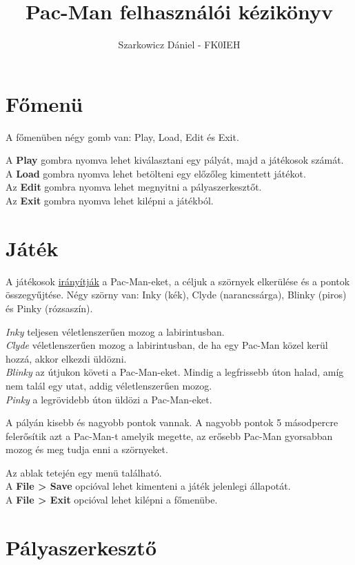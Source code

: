 \documentclass{article}
\title{Pac-Man felhasználói kézikönyv}
\author{Szarkowicz Dániel - FK0IEH}
\date{}
\begin{document}
\maketitle

\section{Főmenü}

A főmenüben négy gomb van: Play, Load, Edit és Exit.

A \textbf{Play} gombra nyomva lehet kiválasztani egy pályát, majd a játékosok számát.\\
A \textbf{Load} gombra nyomva lehet betölteni egy előzőleg kimentett játékot.\\
Az \textbf{Edit} gombra nyomva lehet megnyitni a pályaszerkesztőt.\\
Az \textbf{Exit} gombra nyomva lehet kilépni a játékból.

\section{Játék}

A játékosok \hyperref[appendix:controls]{irányítják} a Pac-Man-eket, a céljuk
a szörnyek elkerülése és a pontok összegyűjtése.
Négy szörny van: Inky (kék), Clyde (narancssárga), Blinky (piros) és Pinky (rózsaszín).

\textit{Inky} teljesen véletlenszerűen mozog a labirintusban.\\
\textit{Clyde} véletlenszerűen mozog a labirintusban, de ha egy Pac-Man közel kerül
hozzá, akkor elkezdi üldözni.\\
\textit{Blinky} az útjukon követi a Pac-Man-eket. Mindig a legfrissebb úton halad,
amíg nem talál egy utat, addig véletlenszerűen mozog.\\
\textit{Pinky} a legrövidebb úton üldözi a Pac-Man-eket.

A pályán kisebb és nagyobb pontok vannak. A nagyobb pontok 5 másodpercre
felerősítik azt a Pac-Man-t amelyik megette, az erősebb Pac-Man gyorsabban
mozog és meg tudja enni a szörnyeket.

Az ablak tetején egy menü található.\\
A \textbf{File > Save} opcióval lehet kimenteni a játék jelenlegi állapotát.\\
A \textbf{File > Exit} opcióval lehet kilépni a főmenübe.

\section{Pályaszerkesztő}
\end{document}
